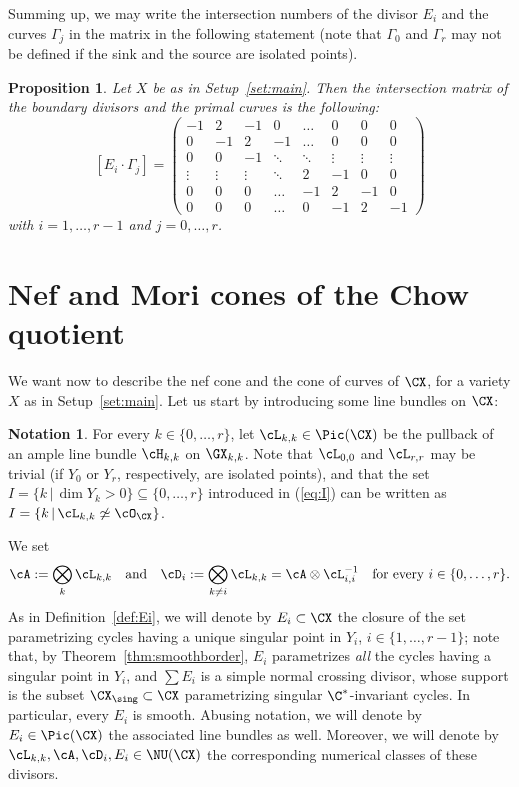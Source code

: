 \documentclass[11pt]{amsart}
\numberwithin{equation}{section}
\newtheorem{proposition}[theorem]{Proposition}
\theoremstyle{definition}
\newtheorem{notation}[theorem]{Notation}
\theoremstyle{remark}
\begin{document}
Summing up, we may write the intersection numbers of the divisor $E_i$ and the curves $\Gamma_j$ in the matrix in the following statement (note that $\Gamma_0$ and $\Gamma_r$ may not be defined if the sink and the source are isolated points). 

\begin{proposition}\label{prop:intnumbers}
Let $X$ be as in Setup~\ref{set:main}.  Then the  intersection matrix of the boundary divisors and the primal curves 
is the following:
\[
[E_i \cdot \Gamma_j]=
\begin{pmatrix}-1&2&-1&0&\dots&0&0&0\\
0&-1&2&-1&\dots&0&0&0\\
0&0&-1&\ddots&\ddots&\vdots&\vdots&\vdots\\
\vdots&\vdots&\vdots&\ddots&2&-1&0&0\\
0&0&0&\dots&-1&2&-1&0\\
0&0&0&\dots&0&-1&2&-1\end{pmatrix}
\]
with $i=1,\dots, r-1$ and $j = 0,\dots,r$.
\end{proposition}



\section{Nef and Mori cones of the Chow quotient}\label{sec:nefmori}

We want now to describe the nef cone and the cone of curves of $\CX$, for a variety $X$ as in Setup~\ref{set:main}.
Let us start by introducing some line bundles on $\CX$:
\begin{notation}\label{not:divisors}
For every $k\in \{0,\dots,r\}$, let $\cL_{k,k} \in \Pic(\CX)$ be the pullback of an ample line bundle $\cH_{k,k}$ on $\GX_{k,k}$. 
Note that $\cL_{0,0}$ and $\cL_{r,r}$ may be trivial (if $Y_0$ or $Y_r$, respectively, are isolated points), and that the set $I=\{k\,|\, \dim Y_k >0\}\subseteq \{0,\dots, r\}$ introduced in (\ref{eq:I}) can be written as $I =\{k\,|\, \cL_{k,k}\not\simeq \cO_{\CX}\}$.

We set
\[
\cA:=\bigotimes_{k} \cL_{k,k}\quad\mbox{and}\quad \cD_i:=\bigotimes_{k \not =i} \cL_{k,k}=\cA\otimes\cL_{i,i}^{-1} \quad\mbox{for every $i\in \{0,\dots,r\}.$}\]
As in Definition~\ref{def:Ei}, we will denote by $E_i\subset\CX$ the closure of the set parametrizing cycles having a unique singular point in $Y_i$, $i\in \{1,\dots,r-1\}$; note that, by  Theorem~\ref{thm:smoothborder},  $E_i$ parametrizes {\em all} the cycles having a singular point in $Y_i$, and  $\sum E_i$ is a simple normal crossing divisor, whose support is the subset $\CX_{\sing}\subset \CX$ parametrizing singular $\C^*$-invariant cycles. In particular, every $E_i$ is smooth. Abusing notation, we will denote by $E_i\in \Pic(\CX)$  the associated line bundles as well. Moreover, we will denote by $\cL_{k,k},\cA,\cD_{i},E_i\in \NU(\CX)$ the corresponding numerical classes of these divisors. 
\end{notation}
\end{document}
